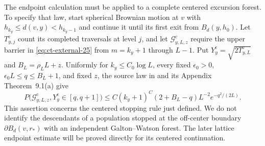 \documentclass[12pt,reqno]{amsart}
\theoremstyle{plain}
\theoremstyle{definition}
\theoremstyle{remark}
\numberwithin{equation}{section}
\begin{document}
The endpoint calculation must be applied to a complete centered excursion
forest.  To specify that law, start spherical Brownian motion at $v$ with
$h_{k_y}\le d(v,y)<h_{k_y-1}$ and continue it until its first exit from
$B_d(y,h_0)$.  Let $T^{\mathrm c}_{y,j}$ count its completed traversals
at level $j$, and let $\mathcal{G}^{\mathrm c}_{y,L,z}$ require the upper
barrier in \eqref{eq:ct-external-25} from $m=k_y+1$ through $L-1$.
Put $Y_y^{\mathrm c}=\sqrt{2T^{\mathrm c}_{y,L}}$ and
$B_L=\rho_LL+z$.  Uniformly for
$k_y\le C_0\log L$, every fixed $\epsilon_0>0$,
$\epsilon_0L\le q\le B_L+1$, and fixed $z$, the source law in
\cite[(2.8)]{Rosen2022} and its Appendix Theorem~9.1(a) give
\begin{equation}
P\big(\mathcal{G}^{\mathrm c}_{y,L,z},Y_y^{\mathrm c}\in[q,q+1]\big)
 \le C(k_y+1)^C(2+B_L-q)L^{-2}e^{-q^2/(2L)}.\label{eq:ct-external-29}
\end{equation}
This assertion concerns the centered stopping rule just defined.  We do not
identify the descendants of a population stopped at the off-center boundary
$\partial B_d(v,r_*)$ with an independent Galton--Watson forest.
The later lattice endpoint estimate will be proved directly for its centered
continuation.
\end{document}
